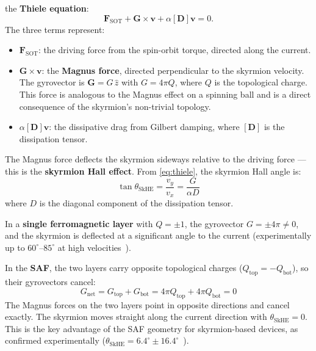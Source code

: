 \documentclass[11pt,a4paper]{article}
\newcommand{\mb}[1]{\mathbf{#1}}
\newcommand{\zhat}{\hat{z}}
\begin{document}
the \textbf{Thiele equation}:
%
\begin{equation}\label{eq:thiele}
\mb{F}_{\text{SOT}} + \mb{G} \times \mb{v}
    + \alpha [\mb{D}] \mb{v} = 0.
\end{equation}
%
The three terms represent:
%
\begin{itemize}[nosep]
\item $\mb{F}_{\text{SOT}}$: the driving force from the spin-orbit
    torque, directed along the current.
\item $\mb{G} \times \mb{v}$: the \textbf{Magnus force}, directed
    perpendicular to the skyrmion velocity.  The gyrovector is
    $\mb{G} = G\,\zhat$ with $G = 4\pi Q$, where $Q$ is the
    topological charge.  This force is analogous to the Magnus
    effect on a spinning ball and is a direct consequence of the
    skyrmion's non-trivial topology.
\item $\alpha[\mb{D}]\mb{v}$: the dissipative drag from Gilbert
    damping, where $[\mb{D}]$ is the dissipation tensor.
\end{itemize}
%
The Magnus force deflects the skyrmion sideways relative to the
driving force --- this is the \textbf{skyrmion Hall effect}.  From
\eqref{eq:thiele}, the skyrmion Hall angle is:
%
\begin{equation}
\tan\theta_{\text{SkHE}} = \frac{v_y}{v_x}
    = \frac{G}{\alpha D}
\end{equation}
%
where $D$ is the diagonal component of the dissipation tensor.

In a \textbf{single ferromagnetic layer} with $Q = \pm 1$, the
gyrovector $G = \pm 4\pi \neq 0$, and the skyrmion is deflected
at a significant angle to the current (experimentally up to
$60^\circ$--$85^\circ$ at high velocities~\cite{pham2024}).

In the \textbf{SAF}, the two layers carry opposite topological
charges ($Q_{\text{top}} = -Q_{\text{bot}}$), so their gyrovectors
cancel:
%
\begin{equation}
G_{\text{net}} = G_{\text{top}} + G_{\text{bot}}
    = 4\pi Q_{\text{top}} + 4\pi Q_{\text{bot}} = 0
\end{equation}
%
The Magnus forces on the two layers point in opposite directions
and cancel exactly.  The skyrmion moves straight along the current
direction with $\theta_{\text{SkHE}} = 0$.  This is the key
advantage of the SAF geometry for skyrmion-based devices, as
confirmed experimentally
($\theta_{\text{SkHE}} = 6.4^\circ \pm 16.4^\circ$~\cite{pham2024}).
\end{document}
